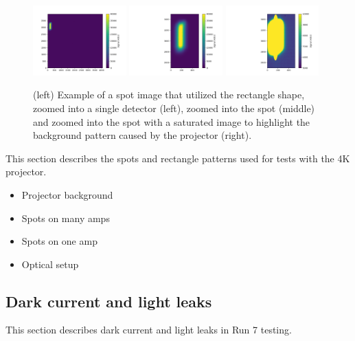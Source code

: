 \begin{figure}[htbp]
\centering
\includegraphics[width=0.32\textwidth]{figures/Rectange_Detector_Ex.png}
\includegraphics[width=0.32\textwidth]{figures/Rectange_Spot_Ex.png}
\includegraphics[width=0.32\textwidth]{figures/Rectange_Spot_Sat.png}
\caption{(left) Example of a spot image that utilized the rectangle shape, zoomed into a single detector (left), zoomed into the spot (middle) and zoomed into the spot with a saturated image to highlight the background pattern caused by the projector (right).}
\label{fig:SpotProjector_Rect}
\end{figure}

This section describes the spots and rectangle patterns used for tests with the 4K
projector.

\begin{itemize}
\tightlist
\item
  Projector background
\item
  Spots on many amps
\item
  Spots on one amp
\item
  Optical setup
\end{itemize}

\subsection{Dark current and light
leaks}\label{dark-current-and-light-leaks}

This section describes dark current and light leaks in Run 7 testing.

